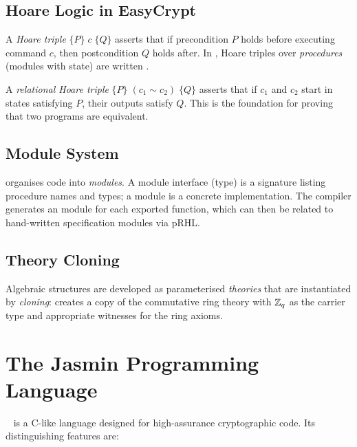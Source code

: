 \subsection{Hoare Logic in EasyCrypt}

A \emph{Hoare triple} $\{P\}\; c\; \{Q\}$ asserts that if precondition $P$
holds before executing command $c$, then postcondition $Q$ holds after.  In
\easycrypt{}, Hoare triples over \emph{procedures} (modules with state) are
written .

A \emph{relational Hoare triple} $\{P\}\; (c_1 \sim c_2)\; \{Q\}$ asserts
that if $c_1$ and $c_2$ start in states satisfying $P$, their outputs satisfy
$Q$.  This is the foundation for proving that two programs are equivalent.

\subsection{Module System}

\easycrypt{} organises code into \emph{modules}.  A module interface (type) is
a signature listing procedure names and types; a module is a concrete
implementation.  The \jasmin{} compiler generates an \easycrypt{} module for
each exported function, which can then be related to hand-written specification
modules via pRHL.

\subsection{Theory Cloning}

Algebraic structures are developed as parameterised \emph{theories} that are
instantiated by \emph{cloning}: 
creates a copy of the commutative ring theory with $\mathbb{Z}_q$ as the carrier type
and appropriate witnesses for the ring axioms.

\section{The Jasmin Programming Language}

\jasmin{}~\cite{Almeida2017} is a C-like language designed for high-assurance
cryptographic code.  Its distinguishing features are:

